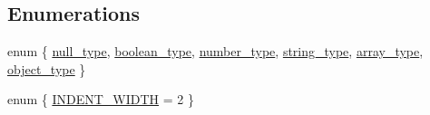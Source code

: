 \subsection*{Enumerations}
\begin{DoxyCompactItemize}
\item 
enum \{ \newline
\hyperlink{namespacepicojson_acbcfb4072b62a8a097a2aaf7a8f8cc02a656199e709e1aaa684dc9b19f6d25f62}{null\+\_\+type}, 
\hyperlink{namespacepicojson_acbcfb4072b62a8a097a2aaf7a8f8cc02ae04a93ebe65786d1f8687430242df802}{boolean\+\_\+type}, 
\hyperlink{namespacepicojson_acbcfb4072b62a8a097a2aaf7a8f8cc02a258b8cac17e3039fe54eadb2f3ebde96}{number\+\_\+type}, 
\hyperlink{namespacepicojson_acbcfb4072b62a8a097a2aaf7a8f8cc02a3cb2900f95eb6459ee2fe4e9a111bef8}{string\+\_\+type}, 
\newline
\hyperlink{namespacepicojson_acbcfb4072b62a8a097a2aaf7a8f8cc02ae1ccb83543a46349939ddf8ccf75d0f2}{array\+\_\+type}, 
\hyperlink{namespacepicojson_acbcfb4072b62a8a097a2aaf7a8f8cc02a1fdd0252e9484bec7aea5dcb1a3f82e9}{object\+\_\+type}
 \}
\item 
enum \{ \hyperlink{namespacepicojson_ae3fd37cd4ad93e8b91a1dd552487eec4a2aee14a2b66d94b58c64c66edd8ed9b1}{I\+N\+D\+E\+N\+T\+\_\+\+W\+I\+D\+TH} = 2
 \}
\end{DoxyCompactItemize}
